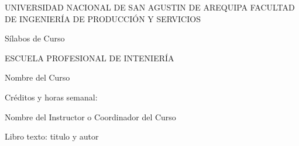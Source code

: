 \documentclass[12pt]{article}
\begin{document}
UNIVERSIDAD NACIONAL DE SAN AGUSTIN DE AREQUIPA
FACULTAD DE INGENIERÍA DE PRODUCCIÓN Y SERVICIOS

Sílabos de Curso

ESCUELA PROFESIONAL DE INTENIERÍA

Nombre del Curso

Créditos y horas semanal:

Nombre del Instructor o Coordinador del Curso

Libro texto: titulo y autor
\end{document}
